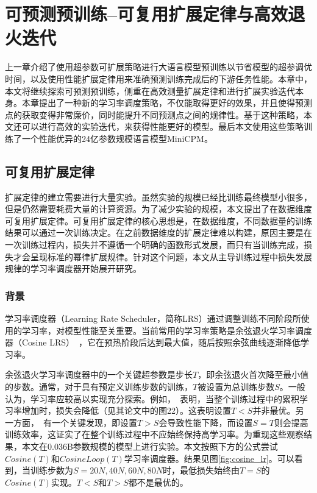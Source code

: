 
\chapter{可预测预训练--可复用扩展定律与高效退火迭代}

上一章介绍了使用超参数可扩展策略进行大语言模型预训练以节省模型的超参调优时间，以及使用性能扩展定律用来准确预测训练完成后的下游任务性能。本章中，本文将继续探索可预测预训练，侧重在高效测量扩展定律和进行扩展实验迭代本身。本章提出了一种新的学习率调度策略，不仅能取得更好的效果，并且使得预测点的获取变得非常廉价，同时能提升不同预测点之间的规律性。基于这种策略，本文还可以进行高效的实验迭代，来获得性能更好的模型。最后本文使用这些策略训练了一个性能优异的24亿参数规模语言模型MiniCPM。


\section{可复用扩展定律}
扩展定律的建立需要进行大量实验。虽然实验的规模已经比训练最终模型小很多，但是仍然需要耗费大量的计算资源。为了减少实验的规模，本文提出了在数据维度可复用扩展定律。可复用扩展定律的核心思想是，在数据维度，不同数据量的训练结果可以通过一次训练决定。在之前数据维度的扩展定律难以构建，原因主要是在一次训练过程内，损失并不遵循一个明确的函数形式发展，而只有当训练完成，损失才会呈现标准的幂律扩展规律。针对这个问题，本文从主导训练过程中损失发展规律的学习率调度器开始展开研究。

\subsection{背景}
学习率调度器（Learning Rate Scheduler，简称LRS）通过调整训练不同阶段所使用的学习率，对模型性能至关重要。当前常用的学习率策略是余弦退火学习率调度器（Cosine LRS）~\citep{kaplan2020scaling, hoffmann2022training, rae2021scaling, touvron2023llama, bai2023qwen, almazrouei2023falcon}，它在预热阶段后达到最大值，随后按照余弦曲线逐渐降低学习率。

余弦退火学习率调度器中的一个关键超参数是步长$T$，即余弦退火首次降至最小值的步数。通常，对于具有预定义训练步数的训练，$T$被设置为总训练步数$S$。一般认为，学习率应较高以实现充分探索。例如，~\citet{kaplan2020scaling}表明，当整个训练过程中的累积学习率增加时，损失会降低（见其论文中的图22）。这表明设置$T < S$并非最优。另一方面，~\citet{hoffmann2022training}有一个关键发现，即设置$T > S$会导致性能下降，而设置$S = T$则会提高训练效率，这证实了在整个训练过程中不应始终保持高学习率。为重现这些观察结果，本文在0.036B参数规模的模型上进行实验。本文按照下方的公式尝试$Cosine(T)$和$CosineLoop(T)$学习率调度器。结果见图\ref{fig:cosine_lr}。可以看到，当训练步数为$S = 20N, 40N, 60N, 80N$时，最低损失始终由$T = S$的$Cosine(T)$实现。$T < S$和$T > S$都不是最优的。

